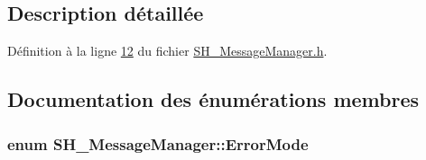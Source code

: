 \subsection{Description détaillée}


Définition à la ligne \hyperlink{SH__MessageManager_8h_source_l00012}{12} du fichier \hyperlink{SH__MessageManager_8h_source}{S\-H\-\_\-\-Message\-Manager.\-h}.



\subsection{Documentation des énumérations membres}
\hypertarget{classSH__MessageManager_a13742daa1342475d4fcee295b9dee4ee}{
\subsubsection[{Error\-Mode}]{\setlength{\rightskip}{0pt plus 5cm}enum {\bf S\-H\-\_\-\-Message\-Manager\-::\-Error\-Mode}}}\label{classSH__MessageManager_a13742daa1342475d4fcee295b9dee4ee}
